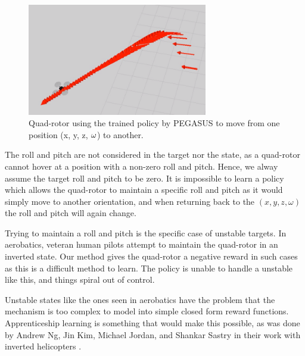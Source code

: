 \documentclass[hidelinks,BTech]{iitmdiss}
\begin{document}
\begin{figure}[H]
  \centering
    \includegraphics[width=0.7\textwidth]{quadrotor_position_control2.png}
    \caption{Quad-rotor using the trained policy by PEGASUS to move from one position (x, y, z, $\protect\omega$) to another.}
\end{figure}

The roll and pitch are not considered in the target nor the state, as a quad-rotor cannot hover at a position with a non-zero roll and pitch. Hence, we alway assume the target roll and pitch to be zero. It is impossible to learn a policy which allows the quad-rotor to maintain a specific roll and pitch as it would simply move to another orientation, and when returning back to the $(x, y, z, \omega)$ the roll and pitch will again change.

Trying to maintain a roll and pitch is the specific case of unstable targets. In aerobatics, veteran human pilots attempt to maintain the quad-rotor in an inverted state. Our method gives the quad-rotor a negative reward in such cases as this is a difficult method to learn. The policy is unable to handle a unstable like this, and things spiral out of control.

Unstable states like the ones seen in aerobatics have the problem that the mechanism is too complex to model into simple closed form reward functions. Apprenticeship learning is something that would make this possible, as was done by Andrew Ng, Jin Kim, Michael Jordan, and Shankar Sastry in their work with inverted helicopters \cite{InvertedHelicopterFlight}.
\end{document}
